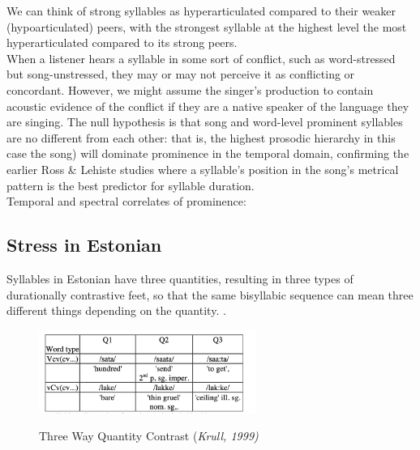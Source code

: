 \documentclass[11pt]{article}
\begin{document}
We can think of strong syllables as hyperarticulated compared to their weaker (hypoarticulated) peers, with the strongest syllable at the highest level the most hyperarticulated compared to its strong peers. \\

 
 

 When a listener hears a syllable in some sort of conflict, such as word-stressed but song-unstressed, they may or may not perceive it as conflicting or concordant. However, we might assume the singer's production to contain acoustic evidence of the conflict if they are a native speaker of the language they are singing. The null hypothesis is that song and word-level prominent syllables are no different from each other: that is, the highest prosodic hierarchy in this case the song) will dominate prominence in the temporal domain, confirming the earlier Ross \& Lehiste studies where a syllable's position in the song's metrical pattern is the best predictor for syllable duration.   \\
Temporal and spectral correlates of prominence: \\ 

\subsection*{Stress in Estonian}

Syllables in Estonian have three quantities, resulting in three types of durationally contrastive feet, so that the same bisyllabic sequence can mean three different things depending on the quantity. \cite{rossTimingEstonianFolk1998}.
 \begin{figure}[htbp]
 \begin{center}
 \includegraphics[width=200pt]{figures/Quantity.png}\\

 \caption{Three Way Quantity Contrast {(\it Krull, 1999)}}
 \label{quant_cont}
 \end{center}
 \end{figure}
 
\end{document}
